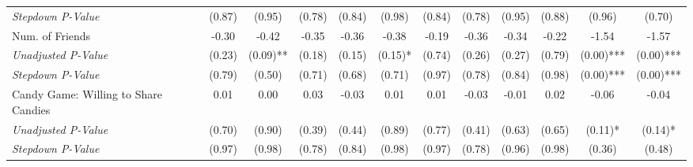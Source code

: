 \begin{tabular}{l c c c c c c c c c c c}
\quad \textit{Stepdown P-Value} & (0.87) & (0.95) & (0.78) & (0.84) & (0.98) & (0.84) & (0.78) & (0.95) & (0.88) & (0.96) & (0.70) \\
Num. of Friends & -0.30 & -0.42 & -0.35 & -0.36 & -0.38 & -0.19 & -0.36 & -0.34 & -0.22 & -1.54 & -1.57 \\
\quad \textit{Unadjusted P-Value} & (0.23) & (0.09)** & (0.18) & (0.15) & (0.15)* & (0.74) & (0.26) & (0.27) & (0.79) & (0.00)*** & (0.00)*** \\
\quad \textit{Stepdown P-Value} & (0.79) & (0.50) & (0.71) & (0.68) & (0.71) & (0.97) & (0.78) & (0.84) & (0.98) & (0.00)*** & (0.00)*** \\
Candy Game: Willing to Share Candies & 0.01 & 0.00 & 0.03 & -0.03 & 0.01 & 0.01 & -0.03 & -0.01 & 0.02 & -0.06 & -0.04 \\
\quad \textit{Unadjusted P-Value} & (0.70) & (0.90) & (0.39) & (0.44) & (0.89) & (0.77) & (0.41) & (0.63) & (0.65) & (0.11)* & (0.14)* \\
\quad \textit{Stepdown P-Value} & (0.97) & (0.98) & (0.78) & (0.84) & (0.98) & (0.97) & (0.78) & (0.96) & (0.98) & (0.36) & (0.48) \\
\bottomrule
\end{tabular}
